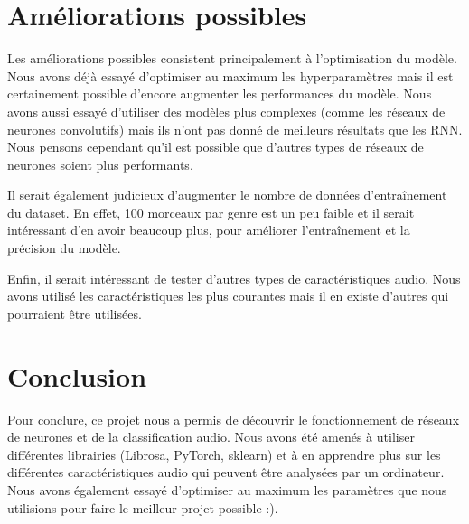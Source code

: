 \documentclass{article}
\begin{document}
\newpage

\section{Améliorations possibles}

Les améliorations possibles consistent principalement à l'optimisation du modèle. Nous avons déjà essayé d'optimiser au maximum les hyperparamètres mais il est certainement possible d'encore augmenter les performances du modèle. Nous avons aussi essayé d'utiliser des modèles plus complexes (comme les réseaux de neurones convolutifs) mais ils n'ont pas donné de meilleurs résultats que les RNN. Nous pensons cependant qu'il est possible que d'autres types de réseaux de neurones soient plus performants.

Il serait également judicieux d'augmenter le nombre de données d'entraînement du dataset. En effet, 100 morceaux par genre est un peu faible et il serait intéressant d'en avoir beaucoup plus, pour améliorer l'entraînement et la précision du modèle.

Enfin, il serait intéressant de tester d'autres types de caractéristiques audio. Nous avons utilisé les caractéristiques les plus courantes mais il en existe d'autres qui pourraient être utilisées.

\section{Conclusion}

Pour conclure, ce projet nous a permis de découvrir le fonctionnement de réseaux de neurones et de la classification audio. Nous avons été amenés à utiliser différentes librairies (Librosa, PyTorch, sklearn) et à en apprendre plus sur les différentes caractéristiques audio qui peuvent être analysées par un ordinateur. Nous avons également essayé d'optimiser au maximum les paramètres que nous utilisions pour faire le meilleur projet possible :).
\end{document}
